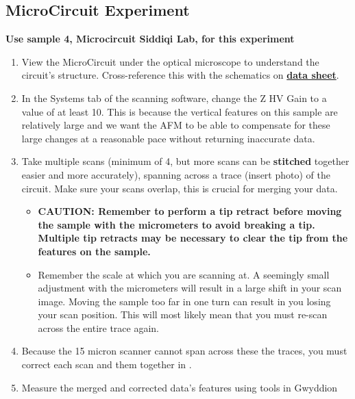 \documentclass{../lab}
\begin{document}
\subsection{MicroCircuit Experiment}

\textbf{Use sample 4, Microcircuit Siddiqi Lab, for this experiment}

\begin{enumerate}
    \item View the MicroCircuit under the optical microscope to understand the circuit's structure. Cross-reference this with the schematics on \href{http://experimentationlab.berkeley.edu/sites/default/files/AFMImages/CSQ\_Resonators\_1July2011\%20.pdf}{\textbf{data sheet}}.

    \item In the Systems tab of the scanning software, change the Z HV Gain to a value of at least 10.  This is because the vertical features on this sample are relatively large and we want the AFM to be able to compensate for these large changes at a reasonable pace without returning inaccurate data.

    \item Take multiple scans (minimum of 4, but more scans can be \textbf{stitched} together easier and more accurately), spanning across a trace (insert photo) of the circuit.  Make sure your scans overlap, this is crucial for merging your data.

    \begin{itemize}
        \item \textbf{CAUTION: Remember to perform a tip retract before moving the sample with the micrometers to avoid breaking a tip. Multiple tip retracts may be necessary to clear the tip from the features on the sample.}

        \item ​Remember the scale at which you are scanning at. A seemingly small adjustment with the micrometers will result in a large shift in your scan image. Moving the sample too far in one turn can result in you losing your scan position.  This will most likely mean that you must re-scan across the entire trace again.

    \end{itemize}

    \item Because the 15 micron scanner cannot span across these the traces, you must correct each scan and \textbf{} them together in\textbf{ }.

    \item Measure the merged and corrected data's features using tools in Gwyddion


\end{enumerate}
\end{document}
